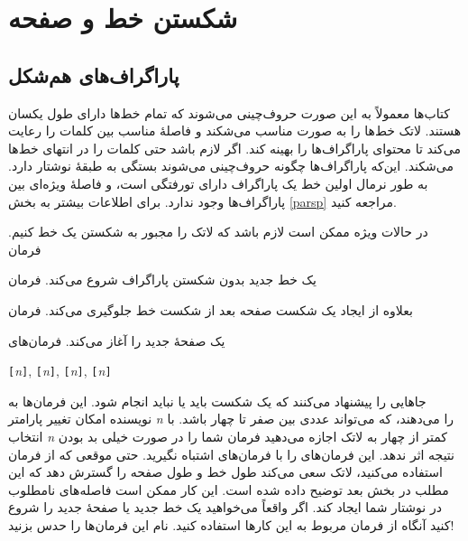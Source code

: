 \section{شکستن خط و صفحه}
\subsection{پاراگراف‌های هم‌شکل}
کتاب‌ها معمولاً به این صورت حروف‌چینی می‌شوند که تمام خط‌ها دارای طول یکسان هستند. لاتک خط‌ها را به صورت مناسب می‌شکند 
و فاصلهٔ مناسب بین کلمات را رعایت می‌کند تا محتوای پاراگراف‌ها را بهینه کند. اگر لازم باشد حتی کلمات را در انتهای خط‌ها می‌شکند. 
این‌که پاراگراف‌ها چگونه حروف‌چینی می‌شوند بستگی به طبقهٔ نوشتار دارد. به طور نرمال اولین خط یک پاراگراف دارای تورفتگی است، 
و فاصلهٔ ویژه‌ای بین پاراگراف‌ها وجود ندارد. برای اطلاعات بیشتر به بخش 
\ref{parsp}
مراجعه کنید.

در حالات ویژه ممکن است لازم باشد که لاتک را مجبور به شکستن یک خط کنیم. فرمان
\begin{lscommand}
\ci{\bs}   
\end{lscommand}
\noindent یک خط جدید بدون شکستن پاراگراف شروع می‌کند. فرمان

\begin{lscommand}
\ci{\bs*}
\end{lscommand}
\noindent بعلاوه از ایجاد یک شکست صفحه بعد از شکست خط جلوگیری می‌کند. فرمان

\begin{lscommand}
\end{lscommand}
\noindent یک صفحهٔ جدید را آغاز می‌کند.  فرمان‌های

\begin{lscommand}
\verb|[|\emph{n}\verb|]|,
\verb|[|\emph{n}\verb|]|, 
\verb|[|\emph{n}\verb|]|,
\verb|[|\emph{n}\verb|]|
\end{lscommand}
\noindent 
جاهایی را پیشنهاد می‌کنند که یک شکست باید یا نباید انجام شود. این فرمان‌ها به نویسنده امکان تغییر پارامتر \emph{n} را می‌دهند، 
که می‌تواند عددی بین صفر تا چهار باشد. با انتخاب \emph{n} کمتر از چهار به لاتک اجازه می‌دهید فرمان شما را در صورت خیلی بد بودن 
نتیجه اثر ندهد. این فرمان‌های  را با فرمان‌های  اشتباه نگیرید. حتی موقعی که از فرمان  
استفاده می‌کنید، لاتک سعی می‌کند طول خط و طول صفحه را گسترش دهد  که این مطلب در بخش بعد توضیح داده شده است. این کار ممکن است فاصله‌های 
نامطلوب در نوشتار شما ایجاد کند. اگر واقعاً می‌خواهید یک خط جدید یا صفحهٔ جدید را شروع کنید آنگاه از فرمان مربوط به این کارها 
استفاده کنید. نام این فرمان‌ها را حدس بزنید!

